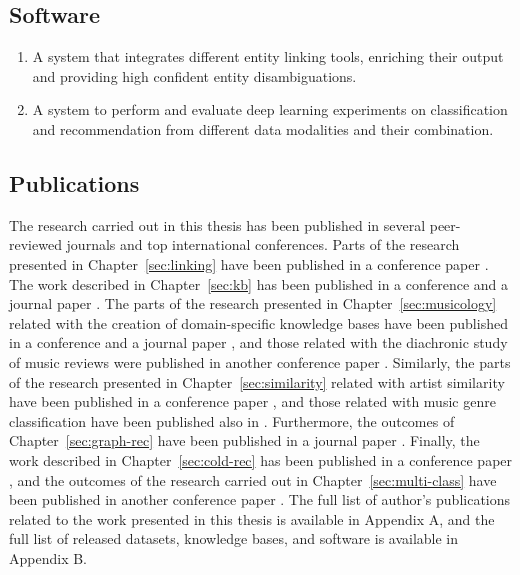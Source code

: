 \subsection{Software}

\begin{enumerate}
\item
A system that integrates different entity linking tools, enriching their output and providing high confident entity disambiguations.

\item
A system to perform and evaluate deep learning experiments on classification and recommendation from different data modalities and their combination. %

\end{enumerate}

\subsection{Publications}
\label{sec:conclusion:publications}

The research carried out in this thesis has been published in several peer-reviewed journals and top international conferences. Parts of the research presented in Chapter~\ref{sec:linking} have been published in a conference paper \citep{Oramas2016}. The work described in Chapter~\ref{sec:kb} has been published in a conference and a journal paper \citep{Oramas2015,Oramas2016a}. The parts of the research presented in Chapter~\ref{sec:musicology} related with the creation of domain-specific knowledge bases have been published in a conference and a journal paper \citep{Oramas2015b,oramas2016knowledge}, and those related with the diachronic study of music reviews were published in another conference paper \citep{oramas2016exploring}. Similarly, the parts of the research presented in Chapter~\ref{sec:similarity} related with artist similarity have been published in a conference paper \citep{Oramas2015a}, and those related with music genre classification have been published also in \cite{oramas2016exploring}. Furthermore, the outcomes of Chapter~\ref{sec:graph-rec} have been published in a journal paper \citep{oramas2016sound}. Finally, the work described in Chapter~\ref{sec:cold-rec} has been published in a conference paper \citep{oramas2017deep}, and the outcomes of the research carried out in Chapter~\ref{sec:multi-class} have been published in another conference paper \citep{oramas2017multi}. The full list of author's publications related to the work presented in this thesis is available in Appendix A, and the full list of released datasets, knowledge bases, and software is available in Appendix B.


